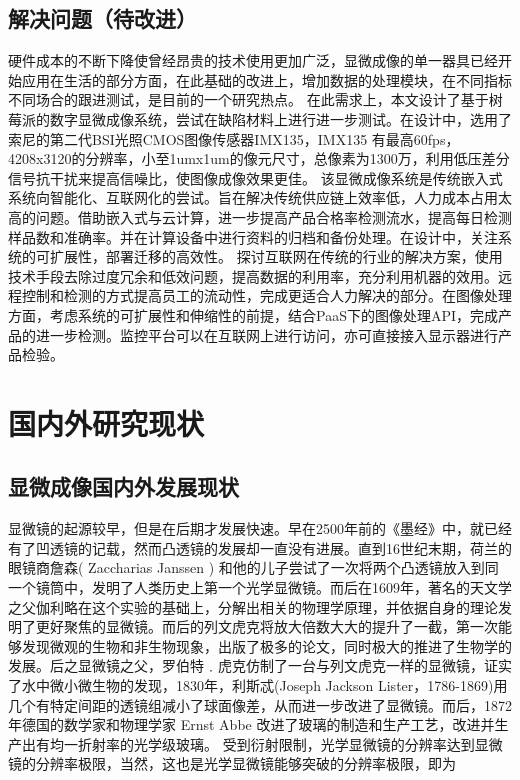 \subsection{解决问题（待改进）}
硬件成本的不断下降使曾经昂贵的技术使用更加广泛，显微成像的单一器具已经开始应用在生活的部分方面，在此基础的改进上，增加数据的处理模块，在不同指标不同场合的跟进测试，是目前的一个研究热点。
在此需求上，本文设计了基于树莓派的数字显微成像系统，尝试在缺陷材料上进行进一步测试。在设计中，选用了索尼的第二代BSI光照CMOS图像传感器IMX135，IMX135 有最高60fps，4208x3120的分辨率，小至1umx1um的像元尺寸，总像素为1300万，利用低压差分信号抗干扰来提高信噪比，使图像成像效果更佳。
该显微成像系统是传统嵌入式系统向智能化、互联网化的尝试。旨在解决传统供应链上效率低，人力成本占用太高的问题。借助嵌入式与云计算，进一步提高产品合格率检测流水，提高每日检测样品数和准确率。并在计算设备中进行资料的归档和备份处理。在设计中，关注系统的可扩展性，部署迁移的高效性。
探讨互联网在传统的行业的解决方案，使用技术手段去除过度冗余和低效问题，提高数据的利用率，充分利用机器的效用。远程控制和检测的方式提高员工的流动性，完成更适合人力解决的部分。在图像处理方面，考虑系统的可扩展性和伸缩性的前提，结合PaaS下的图像处理API，完成产品的进一步检测。监控平台可以在互联网上进行访问，亦可直接接入显示器进行产品检验。

\section{国内外研究现状}
\subsection{显微成像国内外发展现状}
显微镜的起源较早，但是在后期才发展快速。早在2500年前的《墨经》中，就已经有了凹透镜的记载，然而凸透镜的发展却一直没有进展。直到16世纪末期，荷兰的眼镜商詹森( Zaccharias Janssen ) 和他的儿子尝试了一次将两个凸透镜放入到同一个镜筒中，发明了人类历史上第一个光学显微镜。而后在1609年，著名的天文学之父伽利略在这个实验的基础上，分解出相关的物理学原理，并依据自身的理论发明了更好聚焦的显微镜。而后的列文虎克将放大倍数大大的提升了一截，第一次能够发现微观的生物和非生物现象，出版了极多的论文，同时极大的推进了生物学的发展。后之显微镜之父，罗伯特﹒虎克仿制了一台与列文虎克一样的显微镜，证实了水中微小微生物的发现，1830年，利斯忒(Joseph Jackson Lister，1786-1869)用几个有特定间距的透镜组减小了球面像差，从而进一步改进了显微镜。而后，1872年德国的数学家和物理学家 Ernst Abbe 改进了玻璃的制造和生产工艺，改进并生产出有均一折射率的光学级玻璃。
受到衍射限制，光学显微镜的分辨率达到显微镜的分辨率极限，当然，这也是光学显微镜能够突破的分辨率极限，即为


